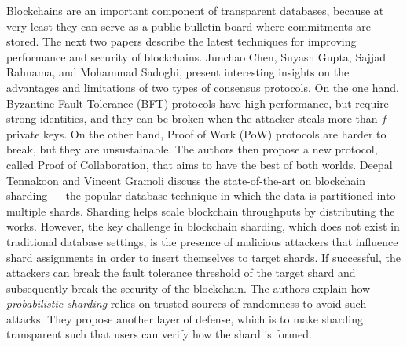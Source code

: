 \documentclass[11pt]{article}
\begin{document}
Blockchains are an important component of transparent databases, because at very least they can serve as a
public bulletin board where commitments are stored. The next two papers describe the latest techniques for
improving performance and security of blockchains. Junchao Chen, Suyash Gupta, Sajjad Rahnama, and Mohammad
Sadoghi, present interesting insights on the advantages and limitations of two types of consensus protocols.
On the one hand, Byzantine Fault Tolerance  (BFT) protocols have high performance, but require 
strong identities, and they can be broken when the attacker steals more than $f$ private
keys. On the other hand, Proof of Work (PoW) protocols are harder to break, but they are unsustainable. The
authors then propose a new protocol, called Proof of Collaboration, that aims to have the best of both worlds.
Deepal Tennakoon and Vincent Gramoli discuss the state-of-the-art on blockchain sharding --- the popular
database technique in which the data is partitioned into multiple shards. Sharding helps scale blockchain
throughputs by distributing the works. However, the key challenge in blockchain sharding, which does not exist
in traditional database settings, is the presence of malicious attackers that
influence shard assignments in order to insert themselves to target shards. If successful, the attackers can
break the fault tolerance threshold of the target shard and subsequently break the security of the
blockchain. The authors explain how {\em probabilistic sharding} relies on trusted sources of randomness
to avoid such attacks. They propose another layer of defense, which is to make sharding transparent
such that users can verify how the shard is formed. 
\end{document}

